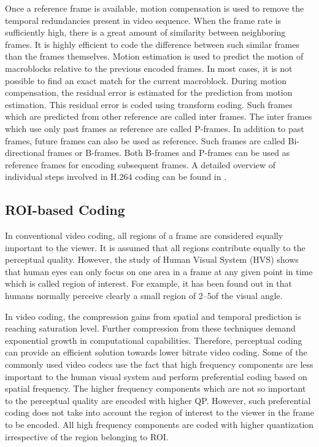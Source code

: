 \documentclass[11pt]{article} %
\begin{document}
Once a reference frame is available, motion compensation is used to remove the temporal redundancies present in video sequence. When the frame rate is sufficiently high, there is a great amount of similarity between neighboring frames. It is highly efficient to code the difference between such similar frames than the frames themselves. Motion estimation is used to predict the motion of macroblocks relative to the previous encoded frames. In most cases, it is not possible to find an exact match for the current macroblock. During motion compensation, the residual error is estimated for the prediction from motion estimation. This residual error is coded using transform coding. Such frames which are predicted from other reference are called inter frames. The inter frames which use only past frames as reference are called P-frames. In addition to past frames, future frames can also be used as reference. Such frames are called Bi-directional frames or B-frames. Both B-frames and P-frames can be used as reference frames for encoding subsequent frames. A detailed overview of individual steps involved in H.264 coding can be found in \cite{h.264-overview}. 


\subsection{ROI-based Coding}

In conventional video coding, all regions of a frame are considered equally important to the viewer. It is assumed that all regions contribute equally to the perceptual quality. However, the study of Human Visual System (HVS) shows that human eyes can only focus on one area in a frame at any given point in time which is called region of interest. For example, it has been found out in \cite{human-vision-proof-NSI} that humans normally perceive clearly a small region of 2–5\degree of the visual angle.

In video coding, the compression gains from spatial and temporal prediction is reaching saturation level. Further compression from these techniques demand exponential growth in computational capabilities. Therefore, perceptual coding can provide an efficient solution towards lower bitrate video coding. Some of the commonly used video codecs use the fact that high frequency components are less important to the human visual system and perform preferential coding based on spatial frequency. The higher frequency components which are not so important to the perceptual quality are encoded with higher QP. However, such preferential coding does not take into account the region of interest to the viewer in the frame to be encoded. All high frequency components are coded with higher quantization irrespective of the region belonging to ROI. 
\end{document}

